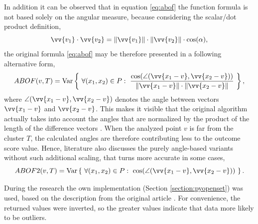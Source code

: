 In addition it can be observed that in equation \ref{eq:abof} the function formula is not based solely on the angular measure, because considering the scalar/dot product definition,
\begin{equation}
    \vv{v_1} \cdot \vv{v_2}
    =
    \norm{\vv{v_1}} \cdot \norm{\vv{v_2}} \cdot \cos(\alpha),
    \label{eq:dotproduct}
\end{equation}
the original formula \ref{eq:abof} may be therefore presented in a following alternative form,
\begin{equation}
    ABOF(v, T) = \mathrm{Var}\left\{
        ~
        \forall (x_1, x_2) \in P:
        ~
        \frac{
            \cos( \angle (\vv{x_1 - v}, \vv{x_2 - v}) )
        }{
            \norm{\vv{x_1 - v}} \cdot \norm{\vv{x_2 - v}}
        }
        ~
    \right\},
    \label{eq:abof-alt}
\end{equation}
where $\angle (\vv{x_1 - v}, \vv{x_2 - v})$ denotes the angle between vectors $\vv{x_1 - v}$ and $\vv{x_2 - v}$. This makes it visible that the original algorithm actually takes into account the angles that are normalized by the product of the length of the difference vectors \cite{Kriegel-2008}. When the analyzed point $v$ is far from the cluster $T$, the calculated angles are therefore contributing less to the outcome score value. Hence, literature \cite{Walkowiak-2018-asmbi} also discusses the purely angle-based variants without such additional scaling, that turns more accurate in some cases,
\begin{equation}
    ABOF2(v, T) = \mathrm{Var}\left\{
        ~
        \forall (x_1, x_2) \in P:
        ~
        \cos( \angle (\vv{x_1 - v}, \vv{x_2 - v}) )
        ~
    \right\}.
    \label{eq:abof2}
\end{equation}

During the research the own implementation (Section \ref{section:pyopenset}) was used, based on the description from the original article \cite{Kriegel-2008}. For convenience, the returned values were inverted, so the greater values indicate that data more likely to be outliers.
